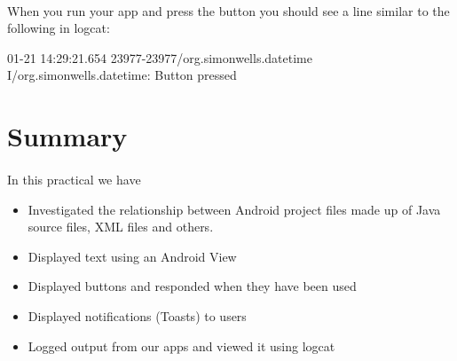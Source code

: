 \paragraph{} When you run your app and press the button you should see a line similar to the following in logcat:

\begin{framed}
{\scriptsize{
01-21 14:29:21.654 23977-23977/org.simonwells.datetime I/org.simonwells.datetime: Button pressed
}}
\end{framed}

\section{Summary}
\paragraph{} In this practical we have 

\begin{itemize}
\item Investigated the relationship between Android project files made up of Java source files, XML files and others.
\item Displayed text using an Android View
\item Displayed buttons and responded when they have been used
\item Displayed notifications (Toasts) to users
\item Logged output from our apps and viewed it using logcat
\end{itemize}

